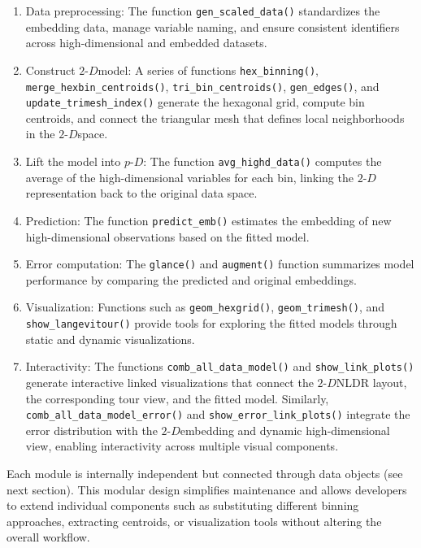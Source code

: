 \documentclass[
  11pt,
  a4paper,
]{report}
\newcommand\pD{$p\text{-}D$}
\newcommand{\twoD}{$2\text{-}D$}
\begin{document}
\begin{enumerate}
\def\labelenumi{\arabic{enumi}.}
\item
  Data preprocessing: The function \texttt{gen\_scaled\_data()}
  standardizes the embedding data, manage variable naming, and ensure
  consistent identifiers across high-dimensional and embedded datasets.
\item
  Construct \twoD model: A series of functions \texttt{hex\_binning()},
  \texttt{merge\_hexbin\_centroids()}, \texttt{tri\_bin\_centroids()},
  \texttt{gen\_edges()}, and \texttt{update\_trimesh\_index()} generate
  the hexagonal grid, compute bin centroids, and connect the triangular
  mesh that defines local neighborhoods in the \twoD space.
\item
  Lift the model into \pD: The function \texttt{avg\_highd\_data()}
  computes the average of the high-dimensional variables for each bin,
  linking the \twoD representation back to the original data space.
\item
  Prediction: The function \texttt{predict\_emb()} estimates the
  embedding of new high-dimensional observations based on the fitted
  model.
\item
  Error computation: The \texttt{glance()} and \texttt{augment()}
  function summarizes model performance by comparing the predicted and
  original embeddings.
\item
  Visualization: Functions such as \texttt{geom\_hexgrid()},
  \texttt{geom\_trimesh()}, and \texttt{show\_langevitour()} provide
  tools for exploring the fitted models through static and dynamic
  visualizations.
\item
  Interactivity: The functions \texttt{comb\_all\_data\_model()} and
  \texttt{show\_link\_plots()} generate interactive linked
  visualizations that connect the \twoD NLDR layout, the corresponding
  tour view, and the fitted model. Similarly,
  \texttt{comb\_all\_data\_model\_error()} and
  \texttt{show\_error\_link\_plots()} integrate the error distribution
  with the \twoD embedding and dynamic high-dimensional view, enabling
  interactivity across multiple visual components.
\end{enumerate}

Each module is internally independent but connected through data objects
(see next section). This modular design simplifies maintenance and
allows developers to extend individual components such as substituting
different binning approaches, extracting centroids, or visualization
tools without altering the overall workflow.
\end{document}
